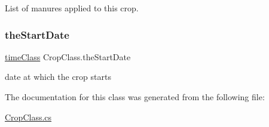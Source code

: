 List of manures applied to this crop. 

\mbox{\label{class_crop_class_a41695be056fe34551f06f3e8e675d22d}} 
\subsubsection{\texorpdfstring{theStartDate}{theStartDate}}
{\footnotesize\ttfamily \mbox{\hyperlink{classtime_class}{time\+Class}} Crop\+Class.\+the\+Start\+Date}



date at which the crop starts 



The documentation for this class was generated from the following file\+:\begin{DoxyCompactItemize}
\item 
\mbox{\hyperlink{_crop_class_8cs}{Crop\+Class.\+cs}}\end{DoxyCompactItemize}
